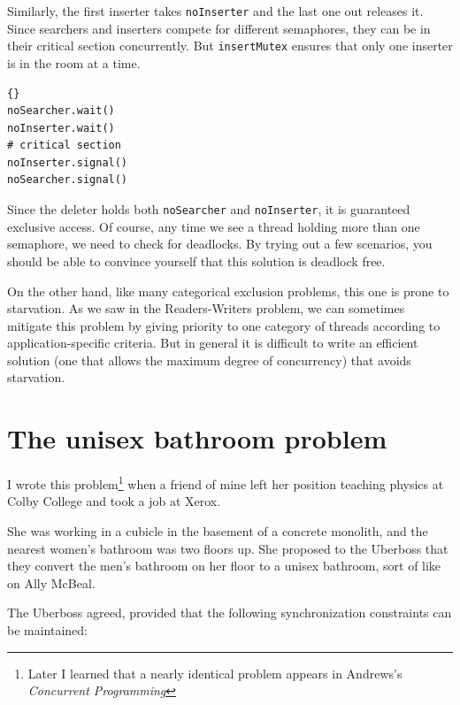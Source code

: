 \documentclass{book}
\begin{document}
Similarly, the first inserter takes {\tt noInserter} and the last one
out releases it.  Since searchers and inserters compete for different
semaphores, they can be in their critical section concurrently.
But {\tt insertMutex} ensures that only one inserter is in the room
at a time.

\begin{latin}
\begin{latin}
\begin{lstlisting}[title={Search-Insert-Delete solution (deleter)}]{}
noSearcher.wait()
noInserter.wait()
# critical section
noInserter.signal()
noSearcher.signal()

\end{lstlisting}
\end{latin}
\end{latin}

Since the deleter holds both {\tt noSearcher} and {\tt noInserter},
it is guaranteed exclusive access.  Of course, any time we see
a thread holding more than one semaphore, we need to check for
deadlocks.  By trying out a few scenarios, you should be able
to convince yourself that this solution is deadlock free.

On the other hand, like many categorical exclusion problems, this
one is prone to starvation.  As we saw in the Readers-Writers problem,
we can sometimes mitigate this problem by giving priority to one
category of threads according to application-specific criteria.
But in general it is difficult to write an efficient solution
(one that allows the maximum degree of concurrency)
that avoids starvation.



\section{The unisex bathroom problem}

I wrote this problem\footnote{Later I learned that a nearly
identical problem appears in Andrews's 
{\em Concurrent Programming}\cite{andrews}} when a friend of mine
left her position teaching physics at Colby College
and took a job at Xerox.

She was working in a cubicle in the basement of a
concrete monolith, and the nearest women's bathroom was two floors up.
She proposed to the Uberboss that they convert the men's bathroom
on her floor to a unisex bathroom, sort of like on Ally McBeal.

The Uberboss agreed, provided that the following synchronization
constraints can be maintained:
\end{document}
